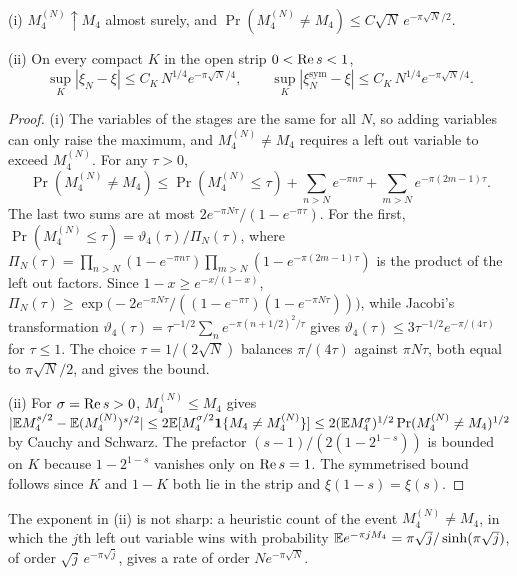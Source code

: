 \begin{theorem}\label{mw:thm:finite}
(i) $M_4^{(N)}\uparrow M_4$ almost surely, and $\Pr(M_4^{(N)}\neq M_4)\leq C\sqrt N\,e^{-\pi\sqrt N/2}$.

(ii) On every compact $K$ in the open strip $0<\operatorname{Re} s<1$,
\[
\sup_K|\xi_N-\xi|\leq C_K\,N^{1/4}e^{-\pi\sqrt N/4},\qquad
\sup_K|\xi_N^{\mathrm{sym}}-\xi|\leq C_K\,N^{1/4}e^{-\pi\sqrt N/4}.
\]
\end{theorem}

\begin{proof}
(i) The variables of the stages are the same for all $N$, so adding variables can only raise the maximum, and $M_4^{(N)}\neq M_4$ requires a left out variable to exceed $M_4^{(N)}$. For any $\tau>0$,
\[
\Pr(M_4^{(N)}\neq M_4)\leq\Pr(M_4^{(N)}\leq\tau)+\sum_{n>N}e^{-\pi n\tau}+\sum_{m>N}e^{-\pi(2m-1)\tau}.
\]
The last two sums are at most $2e^{-\pi N\tau}/(1-e^{-\pi\tau})$. For the first, $\Pr(M_4^{(N)}\leq\tau)=\vartheta_4(\tau)/\Pi_N(\tau)$, where $\Pi_N(\tau)=\prod_{n>N}(1-e^{-\pi n\tau})\prod_{m>N}(1-e^{-\pi(2m-1)\tau})$ is the product of the left out factors. Since $1-x\geq e^{-x/(1-x)}$, $\Pi_N(\tau)\geq\exp\bigl(-2e^{-\pi N\tau}/((1-e^{-\pi\tau})(1-e^{-\pi N\tau}))\bigr)$, while Jacobi's transformation $\vartheta_4(\tau)=\tau^{-1/2}\sum_ne^{-\pi(n+1/2)^2/\tau}$ gives $\vartheta_4(\tau)\leq3\tau^{-1/2}e^{-\pi/(4\tau)}$ for $\tau\leq1$. The choice $\tau=1/(2\sqrt N)$ balances $\pi/(4\tau)$ against $\pi N\tau$, both equal to $\pi\sqrt N/2$, and gives the bound.

(ii) For $\sigma=\operatorname{Re} s>0$, $M_4^{(N)}\leq M_4$ gives $|\mathbb{E} M_4^{s/2}-\mathbb{E}(M_4^{(N)})^{s/2}|\leq2\mathbb{E}[M_4^{\sigma/2}\mathbf 1\{M_4\neq M_4^{(N)}\}]\leq2(\mathbb{E} M_4^{\sigma})^{1/2}\Pr(M_4^{(N)}\neq M_4)^{1/2}$ by Cauchy and Schwarz. The prefactor $(s-1)/(2(1-2^{1-s}))$ is bounded on $K$ because $1-2^{1-s}$ vanishes only on $\operatorname{Re} s=1$. The symmetrised bound follows since $K$ and $1-K$ both lie in the strip and $\xi(1-s)=\xi(s)$.
\end{proof}

The exponent in (ii) is not sharp: a heuristic count of the event $M_4^{(N)}\neq M_4$, in which the $j$th left out variable wins with probability $\mathbb{E} e^{-\pi jM_4}=\pi\sqrt j/\sinh(\pi\sqrt j)$, of order $\sqrt j\,e^{-\pi\sqrt j}$, gives a rate of order $Ne^{-\pi\sqrt N}$.

